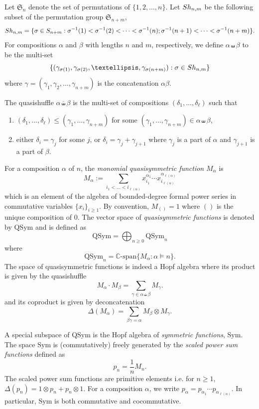 \documentclass[12pt]{amsart}
\numberwithin{equation}{section}
\newcommand{\QSym}{\mathrm{QSym}}
\newcommand{\Sym}{\mathrm{Sym}}
\newcommand{\Sn}{\mathfrak{S}}
\begin{document}
Let $\Sn_n$ denote the set of permutations of $\{1,2,\dots,n\}$. Let ${\rm Sh}_{n,m}$ be the following subset of the permutation group ${\Sn}_{n+m}$,
$${\rm Sh}_{n,m}=\{\sigma\in {S}_{n+m}:\sigma^{-1}(1)<\sigma^{-1}(2)<\cdots<\sigma^{-1}(n);\sigma^{-1}(n+1)<\cdots<\sigma^{-1}(n+m)\}.$$
For compositions $\alpha$ and $\beta$ with lengths $n$ and $m$, respectively, we define $\alpha\shuffle \beta$ to be the multi-set $$\{(\gamma_{\sigma(1)},\gamma_{\sigma(2)},\dots,\gamma_{\sigma(n+m)}):\sigma\in {\rm Sh}_{n,m}\}$$ where $\gamma=(\gamma_1,\gamma_2,\dots,\gamma_{n+m})$ is the concatenation $\alpha\beta$.

The quasishuffle $\alpha\overline{\shuffle}\beta$ is the multi-set of compositions $(\delta_1,\dots,\delta_\ell)$ such that
\begin{enumerate}
	\item $(\delta_1,\dots,\delta_\ell)\leq(\gamma_1,\dots,\gamma_{n+m})$ for some $(\gamma_1,\dots,\gamma_{n+m})\in\alpha\shuffle\beta$,
	\item either $\delta_i=\gamma_j$ for some $j$, or $\delta_i=\gamma_j+\gamma_{j+1}$ where $\gamma_j$ is a part of $\alpha$ and $\gamma_{j+1}$ is a part of $\beta$.
\end{enumerate}

For a composition $\alpha$ of $n$, the {\it monomial quasisymmetric function} $M_{\alpha}$ is
$$M_\alpha:=\sum_{i_1<\ldots<i_{\ell(\alpha)}  }x_{i_1}^{\alpha_1} \cdots x_{i_{\ell(\alpha)}}^{\alpha_{\ell(\alpha)}}$$ 
which is  an element of the  algebra of  bounded-degree formal power series in commutative variables
$\{x_i\}_{i\geq 1}$. By convention, $M_{()}= 1$ where $()$ is the unique composition of $0$.
The vector space of {\it quasisymmetric functions} is denoted by $\QSym$ and is defined as
$$\QSym=\bigoplus_{n\geq 0} \QSym_n$$
where
$$\QSym_n=\mathbb{C}\text{-span}\{ M_\alpha: \alpha \models n \}.$$
The space of quasisymmetric functions is indeed a Hopf algebra where its product is given by the quasishuffle
$$M_\alpha\cdot M_\beta=\sum_{\gamma\in\alpha\overline{\shuffle}\beta}M_\gamma.$$
and its coproduct is given by deconcatenation
$$\Delta(M_\alpha)=\sum_{\beta \gamma=\alpha}M_\beta \otimes M_\gamma.$$ 

A special subspace of $\QSym$ is the Hopf algebra of {\it symmetric functions}, $\Sym$. The space $\Sym$ is (commutatively) freely generated by the {\it scaled power sum functions} defined as
$$p_n=\frac{1}{n}M_{n}.$$
The scaled power sum functions are primitive elements i.e. for $n\geq 1$, $\Delta(p_n)=1\otimes p_n+p_n\otimes 1$. For a composition $\alpha$, we write $p_\alpha=p_{\alpha_1}\cdots p_{\alpha_{\ell(\alpha)}}$. In particular, $\Sym$ is both commutative and cocommutative.
\end{document}
